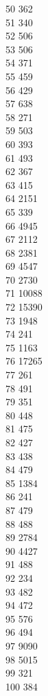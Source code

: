 { 50	362 \\
 51	340 \\
 52	506 \\
 53	506 \\
 54	371 \\
 55	459 \\
 56	429 \\
 57	638 \\
 58	271 \\
 59	503 \\
 60	393 \\
 61	493 \\
 62	367 \\
 63	415 \\
 64	2151 \\
 65	339 \\
 66	4945 \\
 67	2112 \\
 68	2381 \\
 69	4547 \\
 70	2730 \\
 71	10088 \\
 72	15390 \\
 73	1948 \\
 74	241 \\
 75	1163 \\
 76	17265 \\
 77	261 \\
 78	491 \\
 79	351 \\
 80	448 \\
 81	475 \\
 82	427 \\
 83	438 \\
 84	479 \\
 85	1384 \\
 86	241 \\
 87	479 \\
 88	488 \\
 89	2784 \\
 90	4427 \\
 91	488 \\
 92	234 \\
 93	482 \\
 94	472 \\
 95	576 \\
 96	494 \\
 97	9090 \\
 98	5015 \\
 99	321 \\
 100	384 \\
}
